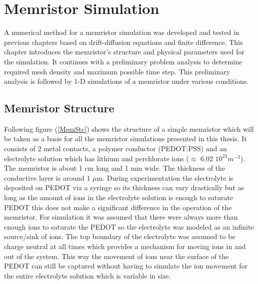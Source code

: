 
\chapter{Memristor Simulation} %

\label{Chapter5} %


A numerical method for a memristor simulation was developed and tested in previous chapters based on drift-diffusion equations and finite difference. This chapter introduces the memristor's structure and physical parameters used for the simulation. It continues with a preliminary problem analysis to determine required mesh density and maximum possible time step. This preliminary analysis is followed by 1-D simulations of a memristor under various conditions.

\section{Memristor Structure}
Following figure (\ref{MemStc}) shows the structure of a simple memristor which will be taken as a basis for all the memristor simulations presented in this thesis. It consists of 2 metal contacts, a polymer conductor (PEDOT:PSS) and an electrolyte solution which has lithium and perchlorate ions ($\approx$ 6.02 $10^{23} m^{-3}$). The memristor is about 1 cm long and 1 mm wide. The thickness of the conductive layer is around 1 $\mu$m. During experimentation the electrolyte is deposited on PEDOT via a syringe so its thickness can vary drastically but as long as the amount of ions in the electrolyte solution is enough to saturate PEDOT this does not make a significant difference in the operation of the memristor. For simulation it was assumed that there were always more than enough ions to saturate the PEDOT so the electrolyte was modeled as an infinite source/sink of ions. The top boundary of the electrolyte was assumed to be charge neutral at all times which provides a mechanism for moving ions in and out of the system. This way the movement of ions near the surface of the PEDOT can still be captured without having to simulate the ion movement for the entire electrolyte solution which is variable in size. 

